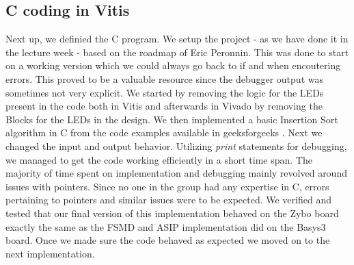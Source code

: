 \documentclass[conference]{IEEEtran}
\begin{document}
\subsection{C coding in Vitis}
Next up, we definied the C program. We setup the project - as we have done it in the lecture week - based on the roadmap of Eric Peronnin. This was done to start on a working version which we could always go back to if and when encoutering errors. This proved to be a valuable resource since the debugger output was sometimes not very explicit. We started by removing the logic for the LEDs present in the code both in Vitis and afterwards in Vivado by removing the Blocks for the LEDs in the design. We then implemented a basic Insertion Sort algorithm in C from the code examples available in geeksforgeeks \cite{g4g}. Next we changed the input and output behavior. Utilizing \textit{print} statements for debugging, we managed to get the code working efficiently in a short time span. The majority of time spent on implementation and debugging mainly revolved around issues with pointers. Since no one in the group had any expertise in C, errors pertaining to pointers and similar issues were to be expected. We verified and tested that our final version of this implementation behaved on the Zybo board exactly the same as the FSMD and ASIP implementation did on the Basys3 board. Once we made sure the code behaved as expected we moved on to the next implementation.
\end{document}
